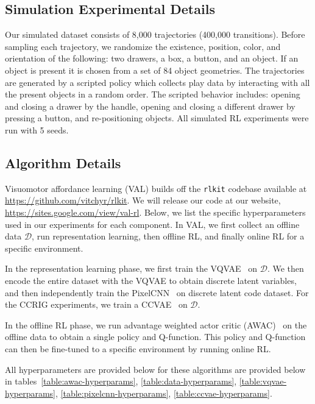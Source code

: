 \documentclass[letterpaper, 10 pt, conference]{ieeeconf}  %
\begin{document}
\subsection{Simulation Experimental Details} \label{sec:appendix_sim}

Our simulated dataset consists of 8,000 trajectories (400,000 transitions). Before sampling each trajectory, we randomize the existence, position, color, and orientation of the following: two drawers, a box, a button, and an object. If an object is present it is chosen from a set of 84 object geometries. The trajectories are generated by a scripted policy which collects play data by interacting with all the present objects in a random order. The scripted behavior includes: opening and closing a drawer by the handle, opening and closing a different drawer by pressing a button, and re-positioning objects. All simulated RL experiments were run with 5 seeds.

\subsection{Algorithm Details}

Visuomotor affordance learning (VAL) builds off the \texttt{rlkit} codebase available at \url{https://github.com/vitchyr/rlkit}. We will release our code at our website, \url{https://sites.google.com/view/val-rl}. Below, we list the specific hyperparameters used in our experiments for each component. In VAL, we first collect an offline data $\mathcal{D}$, run representation learning, then offline RL, and finally online RL for a specific environment.

In the representation learning phase, we first train the VQVAE~\cite{oord2017vqvae} on $\mathcal{D}$. We then encode the entire dataset with the VQVAE to obtain discrete latent variables, and then independently train the PixelCNN~\cite{oord2016pixelcnn} on discrete latent code dataset. For the CCRIG experiments, we train a CCVAE~\cite{sohn2015cvae} on $\mathcal{D}$.

In the offline RL phase, we run advantage weighted actor critic (AWAC)~\cite{nair2020awac} on the offline data to obtain a single policy and Q-function. This policy and Q-function can then be fine-tuned to a specific environment by running online RL. 

All hyperparameters are provided below for these algorithms are provided below in tables~\ref{table:awac-hyperparams}, \ref{table:data-hyperparams}, \ref{table:vqvae-hyperparams}, \ref{table:pixelcnn-hyperparams}, \ref{table:ccvae-hyperparams}.
\end{document}
